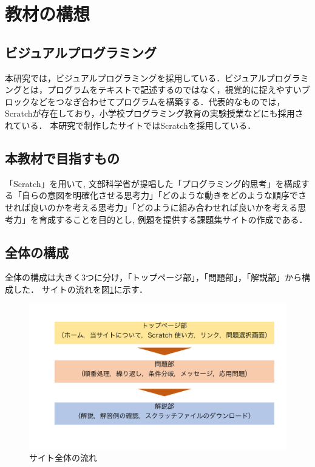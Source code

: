 
\newpage

\section{\rm 教材の構想}

\subsection{ビジュアルプログラミング}
本研究では，ビジュアルプログラミングを採用している．ビジュアルプログラミングとは，プログラムをテキストで記述するのではなく，視覚的に捉えやすいブロックなどをつなぎ合わせてプログラムを構築する．代表的なものでは，Scratchが存在しており，小学校プログラミング教育の実験授業などにも採用されている．
本研究で制作したサイトではScratchを採用している．

\subsection{本教材で目指すもの}
「Scratch」を用いて, 文部科学省が提唱した「プログラミング的思考」を構成する「自らの意図を明確化させる思考力」「どのような動きをどのような順序でさせれば良いのかを考える思考力」「どのように組み合わせれば良いかを考える思考力」を育成することを目的とし, 例題を提供する課題集サイトの作成である．

\subsection{全体の構成}
全体の構成は大きく3つに分け，「トップページ部」，「問題部」，「解説部」から構成した．
サイトの流れを図\ref{fig:nagare}に示す．

\begin{figure}[h]
\begin{center}
\includegraphics[width=15cm]{nagare.pdf}
\caption{サイト全体の流れ}
\label{fig:nagare}
\end{center}
\end{figure}
\newpage

